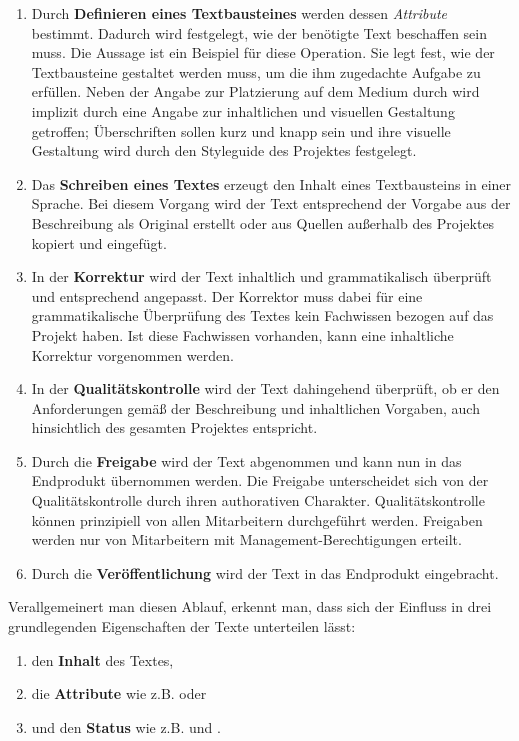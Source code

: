 \begin{enumerate}
\item Durch \textbf{Definieren eines Textbausteines} werden dessen \emph{Attribute} bestimmt. Dadurch wird festgelegt, wie der benötigte Text beschaffen sein muss. Die Aussage  ist ein Beispiel für diese Operation. Sie legt fest, wie der Textbausteine gestaltet werden muss, um die ihm zugedachte Aufgabe zu erfüllen. Neben der Angabe zur Platzierung auf dem Medium durch  wird implizit durch  eine Angabe zur inhaltlichen und visuellen Gestaltung getroffen; Überschriften sollen kurz und knapp sein und ihre visuelle Gestaltung wird durch den Styleguide des Projektes festgelegt.
\item Das \textbf{Schreiben eines Textes} erzeugt den Inhalt eines Textbausteins in einer Sprache. Bei diesem Vorgang wird der Text entsprechend der Vorgabe aus der Beschreibung als Original erstellt oder aus Quellen außerhalb des Projektes kopiert und eingefügt.
\item In der \textbf{Korrektur} wird der Text inhaltlich und grammatikalisch überprüft und entsprechend angepasst. Der Korrektor muss dabei für eine grammatikalische Überprüfung des Textes kein Fachwissen bezogen auf das Projekt haben. Ist diese Fachwissen vorhanden, kann eine inhaltliche Korrektur vorgenommen werden.
\item In der \textbf{Qualitätskontrolle} wird der Text dahingehend überprüft, ob er den Anforderungen gemäß der Beschreibung und inhaltlichen Vorgaben, auch hinsichtlich des gesamten Projektes entspricht.
\item Durch die \textbf{Freigabe} wird der Text abgenommen und kann nun in das Endprodukt übernommen werden. Die Freigabe unterscheidet sich von der Qualitätskontrolle durch ihren authorativen Charakter. Qualitätskontrolle können prinzipiell von allen Mitarbeitern durchgeführt werden. Freigaben werden nur von Mitarbeitern mit Management-Berechtigungen erteilt.
\item Durch die \textbf{Veröffentlichung} wird der Text in das Endprodukt eingebracht.
\end{enumerate}

\begin{samepage}
Verallgemeinert man diesen Ablauf, erkennt man, dass sich der Einfluss in drei grundlegenden Eigenschaften der Texte unterteilen lässt:

\begin{enumerate}\itemsep -5pt
\item den \textbf{Inhalt} des Textes,
\item die \textbf{Attribute} wie z.B.  oder 
\item und den \textbf{Status} wie z.B.  und .
\end{enumerate}
\end{samepage}


